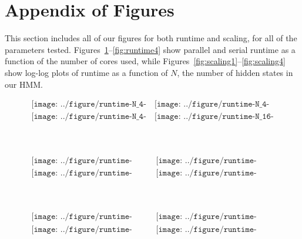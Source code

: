 \appendix

\section{Appendix of Figures}

This section includes all of our figures for both runtime and scaling, for all
of the parameters tested. Figures~\ref{fig:runtime1}--\ref{fig:runtime4} show
parallel and serial runtime as a function of the number of cores used, while
Figures~\ref{fig:scaling1}--\ref{fig:scaling4} show log-log plots of runtime as
a function of $N$, the number of hidden states in our HMM. 

\begin{figure}[htb]
    \centering
    $\begin{array}{cc}
    \texttt{[image: ../figure/runtime-N\_4-T\_100.pdf]} & 
    \texttt{[image: ../figure/runtime-N\_4-T\_200.pdf]} \\
    \texttt{[image: ../figure/runtime-N\_4-T\_500.pdf]} & 
    \texttt{[image: ../figure/runtime-N\_16-T\_100.pdf]} \\
    \end{array}$ 
    \caption{~}
    \label{fig:runtime1}
\end{figure}

\begin{figure}[htb]
    \centering
    $\begin{array}{cc}
    \texttt{[image: ../figure/runtime-N\_16-T\_200.pdf]} & 
    \texttt{[image: ../figure/runtime-N\_16-T\_500.pdf]} \\
    \texttt{[image: ../figure/runtime-N\_64-T\_100.pdf]} & 
    \texttt{[image: ../figure/runtime-N\_64-T\_200.pdf]} \\
    \end{array}$ 
    \caption{~}
    \label{fig:runtime2}
\end{figure}

\begin{figure}[htb]
    \centering
    $\begin{array}{cc}
    \texttt{[image: ../figure/runtime-N\_64-T\_500.pdf]} & 
    \texttt{[image: ../figure/runtime-N\_256-T\_100.pdf]} \\
    \texttt{[image: ../figure/runtime-N\_256-T\_200.pdf]} & 
    \texttt{[image: ../figure/runtime-N\_256-T\_500.pdf]} \\
    \end{array}$ 
    \caption{~}
    \label{fig:runtime3}
\end{figure}

